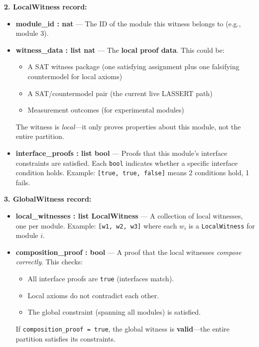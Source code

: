 \textbf{2. LocalWitness record:}
\begin{itemize}
    \item \textbf{module\_id : nat} — The ID of the module this witness belongs to (e.g., module 3).
    
    \item \textbf{witness\_data : list nat} — The \textbf{local proof data}. This could be:
    \begin{itemize}
        \item A SAT witness package (one satisfying assignment plus one falsifying countermodel for local axioms)
        \item A SAT/countermodel pair (the current live LASSERT path)
        \item Measurement outcomes (for experimental modules)
    \end{itemize}
    The witness is \textit{local}---it only proves properties about this module, not the entire partition.
    
    \item \textbf{interface\_proofs : list bool} — Proofs that this module's interface constraints are satisfied. Each \texttt{bool} indicates whether a specific interface condition holds. Example: \texttt{[true, true, false]} means 2 conditions hold, 1 fails.
\end{itemize}

\textbf{3. GlobalWitness record:}
\begin{itemize}
    \item \textbf{local\_witnesses : list LocalWitness} — A collection of local witnesses, one per module. Example: \texttt{[w1, w2, w3]} where each $w_i$ is a \texttt{LocalWitness} for module $i$.
    
    \item \textbf{composition\_proof : bool} — A proof that the local witnesses \textit{compose correctly}. This checks:
    \begin{itemize}
        \item All interface proofs are \texttt{true} (interfaces match).
        \item Local axioms do not contradict each other.
        \item The global constraint (spanning all modules) is satisfied.
    \end{itemize}
    If \texttt{composition\_proof = true}, the global witness is \textbf{valid}---the entire partition satisfies its constraints.
\end{itemize}

